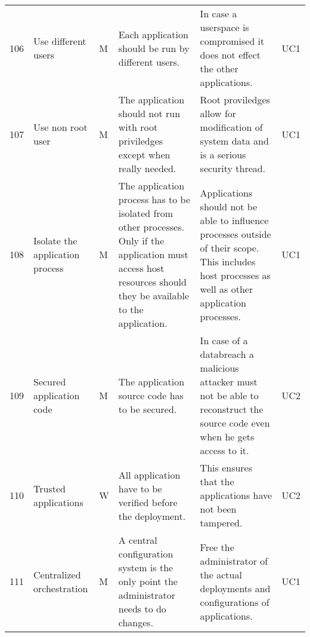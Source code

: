 \begin{longtable}{l p{2cm} p{0.8cm} p{3.6cm} p{4.5cm} p{0.8cm} }
106                     & Use different users                     & M     & Each application should be run by different users.                                                                                                               & In case a userspace is compromised it does not effect the other applications.                                                                                                     & UC1    \\
107                     & Use non root user                       & M     & The application should not run with root priviledges except when really needed.                                                                                  & Root proviledges allow for modification of system data and is a serious security thread.                                                                                          & UC1    \\
108                     & Isolate the application process         & M     & The application process has to be isolated from other processes. Only if the application must access host resources should they be available to the application. & Applications should not be able to influence processes outside of their scope. This includes host processes as well as other application processes.                               & UC1    \\
109                     & Secured application code                & M     & The application source code has to be secured.                                                                                                                   & In case of a databreach a malicious attacker must not be able to reconstruct the source code even when he gets access to it.                                                      & UC2    \\
110                     & Trusted applications                    & W     & All application have to be verified before the deployment.                                                                                                       & This ensures that the applications have not been tampered.                                                                                                                        & UC2    \\
111                     & Centralized orchestration               & M     & A central configuration system is the only point the administrator needs to do changes.                                                                          & Free the administrator of the actual deployments and configurations of applications.                                                                                              & UC1    \\

\end{longtable}
